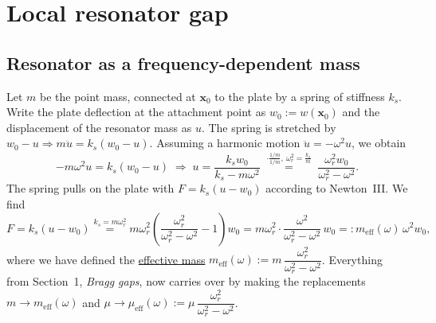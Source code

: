 
\providecommand{\fixed}[1]{{\color{blue!70!black}#1}}
\providecommand{\corr}[1]{\marginpar{\raggedright\footnotesize\color{red!70!black}#1}}

\chapter{Local resonator gap}
\label{ch:local_resonator_gap}

\section{Resonator as a frequency-dependent mass}
\label{sec:resonator_effective_mass}

Let $m$ be the point mass, connected at $\mathbf{x}_0$ to the plate by a spring
of stiffness $k_s$. Write the plate deflection at the attachment point as
$w_0 := w(\mathbf{x}_0)$ and the displacement of the resonator mass as $u$.
The spring is stretched by $w_0 - u \Rightarrow m\ddot{u} = k_s(w_0 - u)$.
Assuming a harmonic motion $\ddot{u} = -\omega^2 u$, we obtain
\begin{equation}
  -m\omega^2 u = k_s(w_0 - u)
  \;\Rightarrow\;
  u = \frac{k_s w_0}{k_s - m\omega^2}
  \;\overset{\cdot\frac{1/m}{1/m},\ \omega_r^2 = \frac{k_s}{m}}{=}\;
  \frac{\omega_r^2 w_0}{\omega_r^2 - \omega^2} .
\end{equation}
The spring pulls on the plate with $F = k_s(u - w_0)$ according to Newton~III.
We find
\begin{equation}
  F = k_s(u - w_0)
  \overset{k_s = m\omega_r^2}{=}
  m\omega_r^2\left(\frac{\omega_r^2}{\omega_r^2 - \omega^2} - 1\right) w_0
  = m\omega_r^2 \cdot \frac{\omega^2}{\omega_r^2 - \omega^2}\, w_0
  =: m_\mathrm{eff}(\omega)\,\omega^2 w_0 ,
  \label{eq:resonator_force}
\end{equation}
where we have defined the \underline{effective mass}
$m_\mathrm{eff}(\omega) := m\,\dfrac{\omega_r^2}{\omega_r^2 - \omega^2}$.
Everything from Section~1, \emph{Bragg gaps}, now carries over by making the
replacements $m \to m_\mathrm{eff}(\omega)$ and
$\mu \to \mu_\mathrm{eff}(\omega) := \mu\,\dfrac{\omega_r^2}{\omega_r^2 - \omega^2}$.

